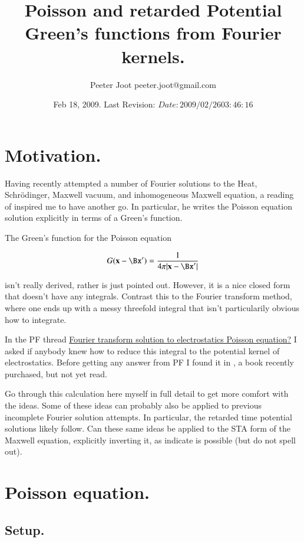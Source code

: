 \documentclass{article}
\title{ Poisson and retarded Potential Green's functions from Fourier kernels. }
\author{Peeter Joot \quad peeter.joot@gmail.com}
\date{ Feb 18, 2009.  Last Revision: $Date: 2009/02/26 03:46:16 $ }
\begin{document}
\maketitle{}
\tableofcontents

\section{ Motivation.}

Having recently attempted a number of Fourier solutions to the Heat, Schr\"{o}dinger, Maxwell vacuum, and inhomogeneous Maxwell equation, a reading
of \cite{mjPerryElectrodynamics} inspired me to have another go.  In particular, he writes the Poisson equation solution explicitly in terms of a Green's
function.

The Green's function for the Poisson equation

\begin{align}
G(\mathbf{x} - \Bx') = \frac{1}{4\pi\lvert{\mathbf{x} -\Bx'}\rvert}
\end{align}

isn't really derived, rather is just pointed out.  However, it is a nice closed form that doesn't have any integrals.
Contrast this to the Fourier transform method, where one ends up with a messy threefold
integral that isn't particularily obvious how to integrate.

In the PF thread \href{http://www.physicsforums.com/showthread.php?t=293550}{Fourier transform solution to electrostatics Poisson equation?}
I asked if anybody knew how to reduce this integral to the
potential kernel of electrostatics.  Before getting any answer from PF I found it in
\cite{byron1992mca}, a book recently purchased, but not yet read.


Go through this calculation here myself in full detail to get more comfort with the ideas.  Some of these ideas can probably also be applied to
previous incomplete Fourier solution attempts.  In particular, the retarded time potential solutions likely follow.
Can these same ideas be applied to the STA form of the Maxwell equation, explicitly inverting it, as
\cite{doran2003gap} indicate is possible (but do not spell out).

\section{ Poisson equation. }
\subsection{ Setup. }
\end{document}
